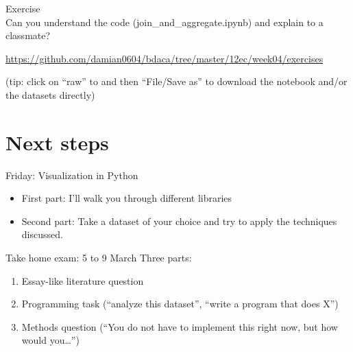 \documentclass[compress]{beamer}
\begin{document}
{
	\begin{frame}[plain]
\end{frame}
	\begin{frame}[plain]
\end{frame}
	\begin{frame}[plain]
\end{frame}
}


\begin{frame}[standout]
Exercise\\
Can you understand the code (join\_and\_aggregate.ipynb) and explain to a classmate?

\url{https://github.com/damian0604/bdaca/tree/master/12ec/week04/exercises}

\footnotesize{(tip: click on ``raw'' to and then ``File/Save as'' to download the notebook and/or the datasets directly)}
\end{frame}


\section{Next steps}
\begin{frame}{}
\begin{block}{Friday: Visualization in Python}
	\begin{itemize}
	\item First part: I'll walk you through different libraries
	\item Second part: Take a dataset of your choice and try to apply the techniques discussed.
	\end{itemize}
\end{block}

\begin{block}{Take home exam: 5 to 9 March}
Three parts: 
\begin{enumerate}
	\item Essay-like literature question
	\item Programming task (``analyze this dataset'', ``write a program that does X'')
	\item Methods question (``You do not have to implement this right now, but how would you\ldots'')
\end{enumerate}
\end{block}
\end{frame}
\end{document}
